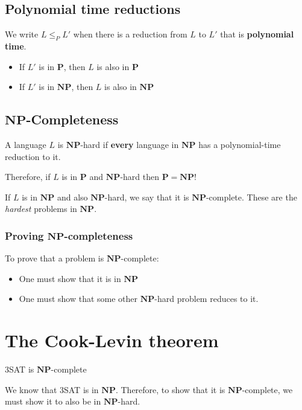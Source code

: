 \documentclass{article}
\newcommand{\NP}{\mathbf{NP}}
\renewcommand{\P}{\mathbf{P}}
\begin{document}
\subsection{Polynomial time reductions}
\label{subsec:polytime-reductions}

We write $L \leq_{P } L '$ when there is a reduction from $L$ to $L ' $ that is \textbf{polynomial time}.
\begin{itemize}
  \item If $L '$ is in $\P$, then $L$ is also in $\P$
  \item If $L '$ is in $\NP$, then $L$ is also in $\NP$
\end{itemize}

\subsection{$\NP$-Completeness}
\label{subsec:np-complete}

A language $L$ is $\NP$-hard if \textbf{every} language in $\NP$ has a polynomial-time reduction to it.

Therefore, if $L$ is in $\P$ and $\NP$-hard then $\P = \NP$!

If $L$ is in $\NP$ and also $\NP$-hard, we say that it is $\NP$-complete. These are the \textit{hardest} problems in $\NP$.

\subsubsection{Proving $\NP$-completeness}

To prove that a problem is $\NP$-complete:

\begin{itemize}
  \item One must show that it is in $\NP$
  \item One must show that some other $\NP$-hard problem reduces to it.
\end{itemize}

\section{The Cook-Levin theorem}
\label{sec:cook-levin}

\begin{theorem}
  \label{theorem:cook-levin}
  3SAT is $\NP$-complete
\end{theorem}

We know that 3SAT is in $\NP$. Therefore, to show that it is $\NP$-complete, we must show it to also be in $\NP$-hard.
\end{document}

